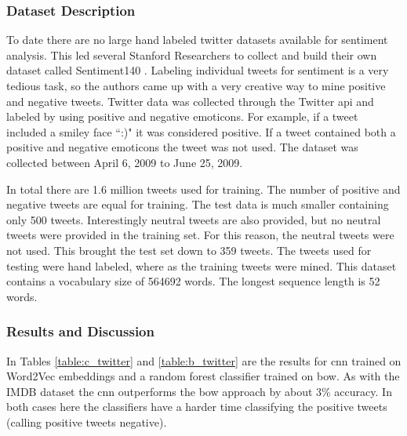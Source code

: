 \documentclass[12pt]{article}
\begin{document}
\subsubsection {Dataset Description}

To date there are no large hand labeled twitter datasets available for sentiment analysis. This led several Stanford Researchers \cite{Go_Bhayani_Huang_2009} to collect and build their own dataset called Sentiment140 \cite{sentiment140}. Labeling individual tweets for sentiment is a very tedious task, so the authors came up with a very creative way to mine positive and negative tweets. Twitter data was collected through the Twitter \ac{api} and labeled by using positive and negative emoticons. For example, if a tweet included a smiley face ``:)" it was considered positive. If a tweet contained both a positive and negative emoticons the tweet was not used. The dataset was collected between April 6, 2009 to June 25, 2009.

In total there are 1.6 million tweets used for training. The number of positive and negative tweets are equal for training. The test data is much smaller containing only 500 tweets. Interestingly neutral tweets are also provided, but no neutral tweets were provided in the training set. For this reason, the neutral tweets were not used. This brought the test set down to 359 tweets. The tweets used for testing were hand labeled, where as the training tweets were mined. This dataset contains a vocabulary size of 564692 words. The longest sequence length is 52 words. 


\subsubsection {Results and Discussion}

In Tables \ref{table:c_twitter} and \ref{table:b_twitter} are the results for \ac{cnn} trained on Word2Vec embeddings and a random forest classifier trained on \ac{bow}. As with the IMDB dataset the \ac{cnn} outperforms the \ac{bow} approach by about 3\% accuracy. In both cases here the classifiers have a harder time classifying the positive tweets (calling positive tweets negative).
\end{document}
